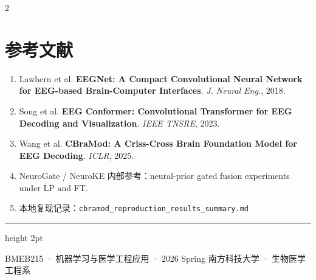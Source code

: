 \documentclass[12pt, a0paper]{article}
\renewcommand{\footnotesize}{\fontsize{15}{20}\selectfont}
\begin{document}
\begin{multicols}{2}
\vspace{1em}
\section*{参考文献}

{\footnotesize
\begin{enumerate}[leftmargin=2em]
    \item Lawhern et al. \textbf{EEGNet: A Compact Convolutional Neural Network for EEG-based Brain-Computer Interfaces}. \textit{J. Neural Eng.}, 2018.
    \item Song et al. \textbf{EEG Conformer: Convolutional Transformer for EEG Decoding and Visualization}. \textit{IEEE TNSRE}, 2023.
    \item Wang et al. \textbf{CBraMod: A Criss-Cross Brain Foundation Model for EEG Decoding}. \textit{ICLR}, 2025.
    \item NeuroGate / NeuroKE 内部参考：neural-prior gated fusion experiments under LP and FT.
    \item 本地复现记录：\texttt{cbramod\_reproduction\_results\_summary.md}
\end{enumerate}
}

\end{multicols}

\vspace{4mm}
{\color{myblue}\hrule height 2pt}
\vspace{3mm}
\begin{center}
{\footnotesize\color{mygray}
    BMEB215 · 机器学习与医学工程应用 · 2026 Spring \hspace{3em}
    南方科技大学 · 生物医学工程系
}
\end{center}
\end{document}
